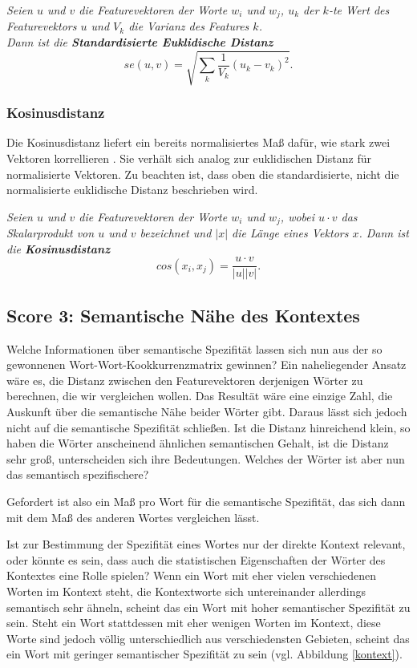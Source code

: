 \documentclass[11pt,numbers=noenddot]{scrartcl}
\begin{document}
\emph{Seien $u$ und $v$ die Featurevektoren der Worte $w_i$ und $w_j$, $u_k$ der $k$-te Wert des Featurevektors $u$ und $V_k$ die Varianz des Features $k$.\\ Dann ist die \textbf{Standardisierte Euklidische Distanz}}
$$
    se(u, v) = \sqrt{ \sum_{k} {\frac{1}{V_k}{ (u_k - v_k)^2 }} }.
$$

\subsubsection{Kosinusdistanz} \label{cosi}

Die Kosinusdistanz liefert ein bereits normalisiertes Maß dafür, wie stark zwei Vektoren korrellieren \citep[S. 300]{manning1999}. Sie verhält sich analog zur euklidischen Distanz für normalisierte Vektoren. Zu beachten ist, dass oben die standardisierte, nicht die normalisierte euklidische Distanz beschrieben wird.

\emph{Seien $u$ und $v$ die Featurevektoren der Worte $w_i$ und $w_j$, wobei $u \cdot v$ das Skalarprodukt von $u$ und $v$ bezeichnet und $|x|$ die Länge eines Vektors $x$. Dann ist die \textbf{Kosinusdistanz}}
$$
    cos(x_i, x_j) = \frac{u \cdot v}{|u||v|}.
$$


\subsection{Score 3: Semantische Nähe des Kontextes} \label{mdcs}

Welche Informationen über semantische Spezifität lassen sich nun aus der so gewonnenen Wort-Wort-Kookkurrenzmatrix gewinnen? Ein naheliegender Ansatz wäre es, die Distanz zwischen den Featurevektoren derjenigen Wörter zu berechnen, die wir vergleichen wollen. Das Resultät wäre eine einzige Zahl, die Auskunft über die semantische Nähe beider Wörter gibt. Daraus lässt sich jedoch nicht auf die semantische Spezifität schließen. Ist die Distanz hinreichend klein, so haben die Wörter anscheinend ähnlichen semantischen Gehalt, ist die Distanz sehr groß, unterscheiden sich ihre Bedeutungen. Welches der Wörter ist aber nun das semantisch spezifischere?

Gefordert ist also ein Maß pro Wort für die semantische Spezifität, das sich dann mit dem Maß des anderen Wortes vergleichen lässt.

Ist zur Bestimmung der Spezifität eines Wortes nur der direkte Kontext relevant, oder könnte es sein, dass auch die statistischen Eigenschaften der Wörter des Kontextes eine Rolle spielen? Wenn ein Wort mit eher vielen verschiedenen Worten im Kontext steht, die Kontextworte sich untereinander allerdings semantisch sehr ähneln, scheint das ein Wort mit hoher semantischer Spezifität zu sein. Steht ein Wort stattdessen mit eher wenigen Worten im Kontext, diese Worte sind jedoch völlig unterschiedlich aus verschiedensten Gebieten, scheint das ein Wort mit geringer semantischer Spezifität zu sein (vgl. Abbildung \ref{kontext}).
\end{document}
